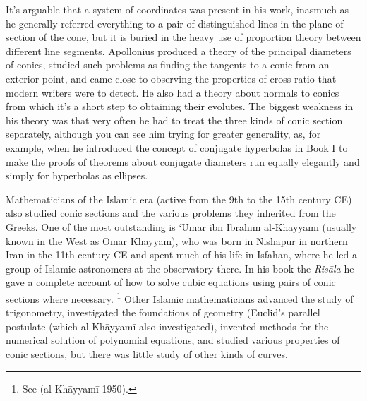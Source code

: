 It's  arguable that a system of
%
coordinates was present in his work,
inasmuch as he generally referred everything to a pair of distinguished
lines in the plane of section of the cone, but it is buried in the heavy
use of proportion theory between different line segments.
Apollonius produced a theory of the principal diameters
%
of conics, studied
such problems as finding the tangents to a
%
%
conic from an exterior point,
and came close to observing the properties of cross-ratio that modern
writers were to detect. He also had a theory about normals to conics
%
from which  it's a short step to obtaining their evolutes.
The biggest weakness in his theory was that very often he had to treat
the three kinds of conic section separately, although you can see him
trying for greater generality, as, for example, when he introduced the
concept of conjugate hyperbolas in Book I to make the proofs of theorems
about conjugate diameters run equally elegantly and simply for hyperbolas
as ellipses.




Mathematicians of the Islamic
%
era  (active from the 9th to the 15th
century CE)
also studied conic sections and the various problems they inherited from
the Greeks. One of the most outstanding is `Umar ibn Ibr\={a}h\={i}m
al-Kh\={a}yyam\={i} (usually known in the West as Omar Khayy\={a}m),
%
%
who was born in Nishapur in northern Iran  in the 11th century CE and
spent much of his life in Isfahan, where he led a group of Islamic
astronomers at the observatory there. In his book the \emph{Ris\={a}la} he
 gave a complete account of how to solve cubic equations
%
using pairs
 of conic sections where necessary.%
\footnote{See (al-Kh\={a}yyam\={i} 1950).} 
%
Other Islamic mathematicians advanced the study of trigonometry,
%
investigated the foundations of geometry (Euclid's parallel postulate
%
%
(which al-Kh\={a}yyam\={i} also investigated), invented methods for
the numerical solution of polynomial equations,
%
and studied various
properties of conic sections, but there was little study of other kinds
of curves.

